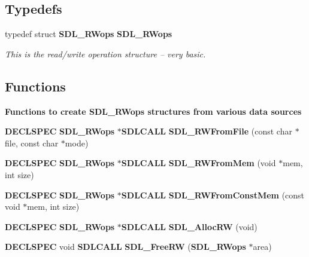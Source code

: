 \subsection*{Typedefs}
\begin{DoxyCompactItemize}
\item 
typedef struct {\bf S\+D\+L\+\_\+\+R\+Wops} {\bf S\+D\+L\+\_\+\+R\+Wops}\label{_s_d_l__rwops_8h_af758c42c576a0612bdf298c5823a5fe5}

\begin{DoxyCompactList}\small\item\em This is the read/write operation structure -- very basic. \end{DoxyCompactList}\end{DoxyCompactItemize}
\subsection*{Functions}
\begin{Indent}{\bf Functions to create S\+D\+L\+\_\+\+R\+Wops structures from various data sources}\par
\begin{DoxyCompactItemize}
\item 
{\bf D\+E\+C\+L\+S\+P\+E\+C} {\bf S\+D\+L\+\_\+\+R\+Wops} $\ast${\bf S\+D\+L\+C\+A\+L\+L} {\bfseries S\+D\+L\+\_\+\+R\+W\+From\+File} (const char $\ast$file, const char $\ast$mode)\label{_s_d_l__rwops_8h_aef7e843c3486bd1770667a594aa0b439}

\item 
{\bf D\+E\+C\+L\+S\+P\+E\+C} {\bf S\+D\+L\+\_\+\+R\+Wops} $\ast${\bf S\+D\+L\+C\+A\+L\+L} {\bfseries S\+D\+L\+\_\+\+R\+W\+From\+Mem} (void $\ast$mem, int size)\label{_s_d_l__rwops_8h_ae6f34841ce63d08597477558ffc0278e}

\item 
{\bf D\+E\+C\+L\+S\+P\+E\+C} {\bf S\+D\+L\+\_\+\+R\+Wops} $\ast${\bf S\+D\+L\+C\+A\+L\+L} {\bfseries S\+D\+L\+\_\+\+R\+W\+From\+Const\+Mem} (const void $\ast$mem, int size)\label{_s_d_l__rwops_8h_a51b4be80c4647e8a473b6b9fed03b1a6}

\item 
{\bf D\+E\+C\+L\+S\+P\+E\+C} {\bf S\+D\+L\+\_\+\+R\+Wops} $\ast${\bf S\+D\+L\+C\+A\+L\+L} {\bfseries S\+D\+L\+\_\+\+Alloc\+R\+W} (void)\label{_s_d_l__rwops_8h_a02d04e13c85cd28706b8c3881c32dd46}

\item 
{\bf D\+E\+C\+L\+S\+P\+E\+C} void {\bf S\+D\+L\+C\+A\+L\+L} {\bfseries S\+D\+L\+\_\+\+Free\+R\+W} ({\bf S\+D\+L\+\_\+\+R\+Wops} $\ast$area)\label{_s_d_l__rwops_8h_ac4c87c7bed186ea1a98531164ff1acfa}

\end{DoxyCompactItemize}
\end{Indent}
